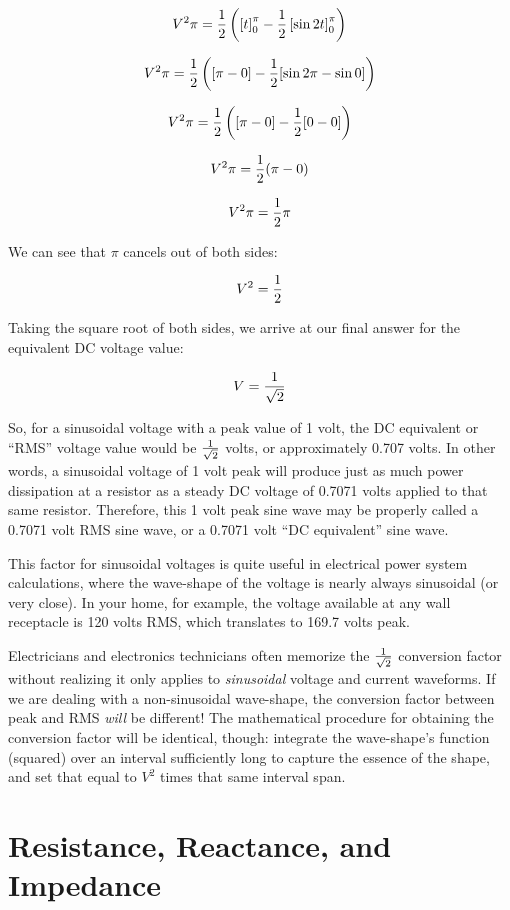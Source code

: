 $$V^2 \pi = {1 \over 2} \left( \left[ t \right]_0^\pi - {1 \over 2}\left[\sin 2t \right]_0^\pi \right)$$

$$V^2 \pi = {1 \over 2} \left( [\pi - 0] - {1 \over 2}[\sin 2\pi - \sin 0] \right)$$

$$V^2 \pi = {1 \over 2} \left( [\pi - 0] - {1 \over 2}[0 - 0] \right)$$

$$V^2 \pi = {1 \over 2} (\pi - 0)$$

$$V^2 \pi = {1 \over 2}\pi$$

We can see that $\pi$ cancels out of both sides:

$$V^2 = {1 \over 2}$$

Taking the square root of both sides, we arrive at our final answer for the equivalent DC voltage value:

$$V = {1 \over \sqrt{2}}$$

So, for a sinusoidal voltage with a peak value of 1 volt, the DC equivalent or ``RMS'' voltage value would be ${1 \over \sqrt{2}}$ volts, or approximately 0.707 volts.  In other words, a sinusoidal voltage of 1 volt peak will produce just as much power dissipation at a resistor as a steady DC voltage of 0.7071 volts applied to that same resistor.  Therefore, this 1 volt peak sine wave may be properly called a 0.7071 volt RMS sine wave, or a 0.7071 volt ``DC equivalent'' sine wave.

This factor for sinusoidal voltages is quite useful in electrical power system calculations, where the wave-shape of the voltage is nearly always sinusoidal (or very close).  In your home, for example, the voltage available at any wall receptacle is 120 volts RMS, which translates to 169.7 volts peak.

Electricians and electronics technicians often memorize the $1 \over \sqrt{2}$ conversion factor without realizing it only applies to \textit{sinusoidal} voltage and current waveforms.  If we are dealing with a non-sinusoidal wave-shape, the conversion factor between peak and RMS \textit{will} be different!  The mathematical procedure for obtaining the conversion factor will be identical, though: integrate the wave-shape's function (squared) over an interval sufficiently long to capture the essence of the shape, and set that equal to $V^2$ times that same interval span.







\filbreak
\section{Resistance, Reactance, and Impedance}


